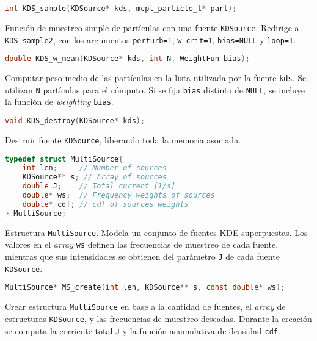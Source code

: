 \begin{footnotesize}
\begin{lstlisting}[language=C]
int KDS_sample(KDSource* kds, mcpl_particle_t* part);
\end{lstlisting}
\begin{addmargin}[0.5cm]{0cm}
Función de muestreo simple de partículas con una fuente \verb|KDSource|. Redirige a \verb|KDS_sample2|, con los argumentos \verb|perturb=1|, \verb|w_crit=1|, \verb|bias=NULL| y \verb|loop=1|.
\end{addmargin}

\begin{lstlisting}[language=C]
double KDS_w_mean(KDSource* kds, int N, WeightFun bias);
\end{lstlisting}
\begin{addmargin}[0.5cm]{0cm}
Computar peso medio de las partículas en la lista utilizada por la fuente \verb|kds|. Se utilizan \verb|N| partículas para el cómputo. Si se fija \verb|bias| distinto de \verb|NULL|, se incluye la función de \emph{weighting} \verb|bias|.
\end{addmargin}

\begin{lstlisting}[language=C]
void KDS_destroy(KDSource* kds);
\end{lstlisting}
\begin{addmargin}[0.5cm]{0cm}
Destruir fuente \verb|KDSource|, liberando toda la memoria asociada.
\end{addmargin}

\begin{lstlisting}[language=C]
typedef struct MultiSource{
	int len;     // Number of sources
	KDSource** s; // Array of sources
	double J;    // Total current [1/s]
	double* ws;  // Frequency weights of sources
	double* cdf; // cdf of sources weights
} MultiSource;
\end{lstlisting}
\begin{addmargin}[0.5cm]{0cm}
Estructura \verb|MultiSource|. Modela un conjunto de fuentes KDE superpuestas. Los valores en el \emph{array} \verb|ws| definen las frecuencias de muestreo de cada fuente, mientras que sus intensidades se obtienen del parámetro \verb|J| de cada fuente \verb|KDSource|.
\end{addmargin}

\begin{lstlisting}[language=C]
MultiSource* MS_create(int len, KDSource** s, const double* ws);
\end{lstlisting}
\begin{addmargin}[0.5cm]{0cm}
Crear estructura \verb|MultiSource| en base a la cantidad de fuentes, el \emph{array} de estructuras \verb|KDSource|, y las frecuencias de muestreo deseadas. Durante la creación se computa la corriente total \verb|J| y la función acumulativa de densidad \verb|cdf|.
\end{addmargin}


\end{footnotesize}
